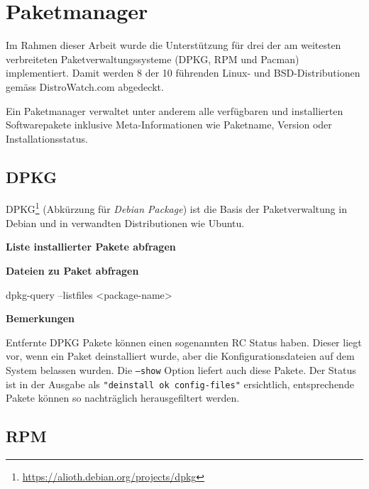 

\section{Paketmanager}
\label{swidgenerator:paketmanager}

Im Rahmen dieser Arbeit wurde die Unterstützung für drei der am weitesten
verbreiteten Paketverwaltungssysteme (DPKG, RPM und Pacman) implementiert. Damit
werden 8 der 10 führenden Linux- und BSD-Distributionen gemäss
DistroWatch.com\cite{distrowatch:2014} abgedeckt.

Ein Paketmanager verwaltet unter anderem alle verfügbaren und installierten
Softwarepakete inklusive Meta-Informationen wie Paketname, Version oder
Installationsstatus.

\subsection{DPKG}

DPKG\footnote{\url{https://alioth.debian.org/projects/dpkg}} (Abkürzung für
\textit{Debian Package}) ist die Basis der Paketverwaltung in Debian und in
verwandten Distributionen wie Ubuntu.

\textbf{Liste installierter Pakete abfragen}


\textbf{Dateien zu Paket abfragen}

\begin{bashcode}
dpkg-query --listfiles <package-name>
\end{bashcode}

\textbf{Bemerkungen}

Entfernte DPKG Pakete können einen sogenannten RC Status haben. Dieser liegt
vor, wenn ein Paket deinstalliert wurde, aber die Konfigurationsdateien auf dem
System belassen wurden. Die \texttt{---show} Option liefert auch diese Pakete.
Der Status ist in der Ausgabe als \texttt{"deinstall ok config-files"}
ersichtlich, entsprechende Pakete können so nachträglich herausgefiltert werden.


\subsection{RPM}

